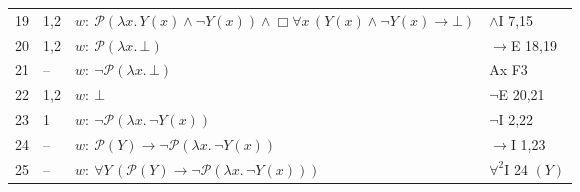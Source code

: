 {\begin{longtable}{@{}r>{\raggedright}p{}p{}>{\raggedright\arraybackslash}p{}@{}}
19 & 1,2 & $w:\ \mathcal{P}(\lambda x.\,Y(x) \wedge \neg Y(x)) \wedge \Box \forall x\, (Y(x) \wedge \neg Y(x) \to \bot)$ & $\wedge$I 7,15\\
20 & 1,2 & $w:\ \mathcal{P}(\lambda x.\,\bot)$ & $\to$E 18,19\\
21 & -- & $w:\ \neg \mathcal{P}(\lambda x.\,\bot)$ & Ax F3\\
22 & 1,2 & $w:\ \bot$ & $\neg$E 20,21\\
23 & 1 & $w:\ \neg \mathcal{P}(\lambda x.\,\neg Y(x))$ & $\neg$I 2,22\\
24 & -- & $w:\ \mathcal{P}(Y) \to \neg \mathcal{P}(\lambda x.\,\neg Y(x))$ & $\to$I 1,23\\
25 & -- & $w:\ \forall Y\, (\mathcal{P}(Y) \to \neg \mathcal{P}(\lambda x.\,\neg Y(x)))$ & $\forall^2$I 24 $(Y)$\\
\bottomrule\end{longtable}}
